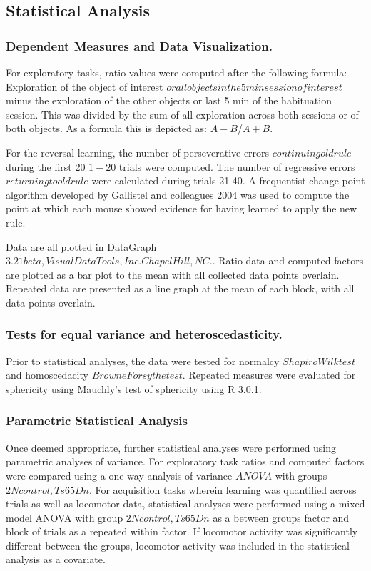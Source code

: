 \documentclass{article}
\begin{document}
\subsection{Statistical Analysis}
\subsubsection{Dependent Measures and Data Visualization.}

For exploratory tasks, ratio values were computed after the following formula: Exploration of the object of interest \(or all objects in the 5 min session of interest\) minus the exploration of the other objects or last 5 min of the habituation session. This was divided by the sum of all exploration across both sessions or of both objects. As a formula this is depicted as: \(A-B\)/\(A+B\).

For the reversal learning, the number of perseverative errors \(continuing old rule\) during the first 20 \(1-20\) trials were computed. The number of regressive errors \(returning to old rule\) were calculated during trials 21-40. A frequentist change point algorithm developed by Gallistel and colleagues \(2004\) was used to compute the point at which each mouse showed evidence for having learned to apply the new rule.

Data are all plotted in DataGraph \(3.21 beta, Visual Data Tools, Inc. Chapel Hill, NC.\). Ratio data and computed factors are plotted as a bar plot to the mean with all collected data points overlain. Repeated data are presented as a line graph at the mean of each block, with all data points overlain.

\subsubsection{Tests for equal variance and heteroscedasticity.}

Prior to statistical analyses, the data were tested for normalcy \(Shapiro Wilk test\) and homoscedacity \(Browne Forsythe test\). Repeated measures were evaluated for sphericity using Mauchly's test of sphericity using R 3.0.1.

\subsubsection{Parametric Statistical Analysis}

Once deemed appropriate, further statistical analyses were performed using parametric analyses of variance. For exploratory task ratios and computed factors were compared using a one-way analysis of variance \(ANOVA\) with groups \(2N control, Ts65Dn\). For acquisition tasks wherein learning was quantified across trials as well as locomotor data, statistical analyses were performed using a mixed model ANOVA with group \(2N control, Ts65Dn\) as a between groups factor and block of trials as a repeated within factor. If locomotor activity was significantly different between the groups, locomotor activity was included in the statistical analysis as a covariate.
\end{document}
